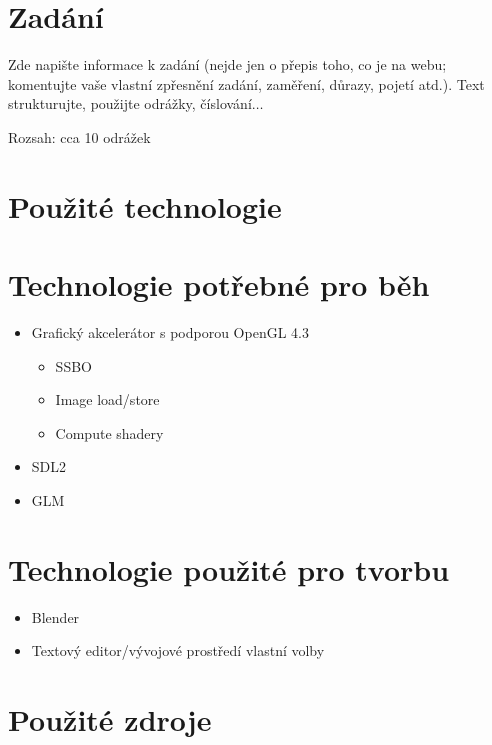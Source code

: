 \documentclass[11pt,a4paper]{article}
\begin{document}
\titlepageandcontents

\section{Zadání}

Zde napište informace k zadání (nejde jen o přepis toho, co je na webu;
komentujte vaše vlastní zpřesnění zadání, zaměření, důrazy, pojetí atd.). Text
strukturujte, použijte odrážky, číslování$\ldots$

Rozsah: cca 10 odrážek

\section{Použité technologie}

\section{Technologie potřebné pro běh}
\begin{itemize}
	\item Grafický akcelerátor s podporou OpenGL 4.3
		\begin{itemize}
			\item SSBO
			\item Image load/store
			\item Compute shadery
		\end{itemize}
	\item SDL2
	\item GLM
\end{itemize}

\section{Technologie použité pro tvorbu}
\begin{itemize}
	\item Blender
	\item Textový editor/vývojové prostředí vlastní volby
\end{itemize}

\section{Použité zdroje}
\end{document}
